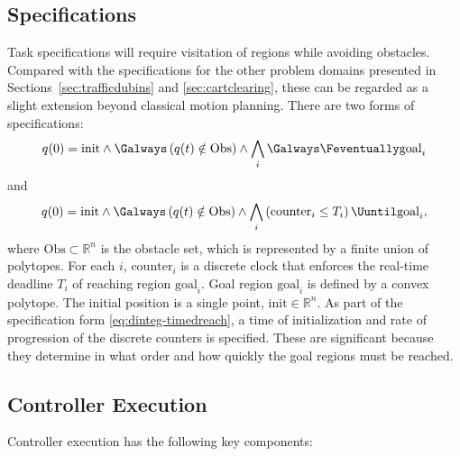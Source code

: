 \documentclass{amsart}
\theoremstyle{definition}
\begin{document}
\subsection{Specifications}

Task specifications will require visitation of regions while avoiding obstacles.
Compared with the specifications for the other problem domains presented in
Sections~\ref{sec:trafficdubins} and \ref{sec:cartclearing}, these can be
regarded as a slight extension beyond classical motion planning.  There are two
forms of specifications:
\begin{equation}\label{eq:dinteg-surveillance}
q(0) = \mathrm{init} \wedge \Galways \left( q(t) \notin \mathrm{Obs} \right) \wedge \bigwedge_{i} \Galways \Feventually \mathrm{goal}_i
\end{equation}
and
\begin{equation}\label{eq:dinteg-timedreach}
q(0) = \mathrm{init} \wedge \Galways \left( q(t) \notin \mathrm{Obs} \right) \wedge \bigwedge_{i} \left( \mathrm{counter}_i \leq T_{i} \right) \Uuntil \mathrm{goal}_i ,
\end{equation}
where $\mathrm{Obs} \subset \mathbb{R}^n$ is the obstacle set, which is
represented by a finite union of polytopes.  For each $i$, $\mathrm{counter}_i$
is a discrete clock that enforces the real-time deadline $T_i$ of reaching
region $\mathrm{goal}_i$.  Goal region $\mathrm{goal}_i$ is defined by a convex
polytope.  The initial position is a single point, $\mathrm{init}\in
\mathbb{R}^n$.  As part of the specification form \eqref{eq:dinteg-timedreach},
a time of initialization and rate of progression of the discrete counters is
specified.  These are significant because they determine in what order and how
quickly the goal regions must be reached.

\subsection{Controller Execution}
Controller execution has the following key components:
\end{document}
